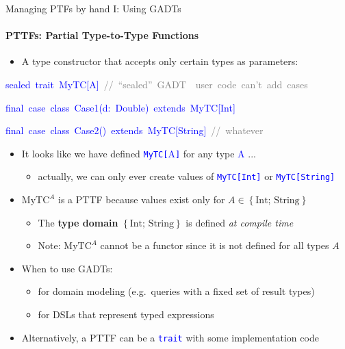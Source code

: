 \documentclass[english]{beamer}
\newenvironment{lyxcode}
   {\par\begin{list}{}{
     \setlength{\rightmargin}{\leftmargin}
     \setlength{\listparindent}{0pt}%
     \raggedright
     \setlength{\itemsep}{0pt}
     \setlength{\parsep}{0pt}
     \normalfont\ttfamily}%
    \def\{{\char`\{}
    \def\}{\char`\}}
    \def\textasciitilde{\char`\~}
    \item[]}
   {\end{list}}
\begin{document}
\begin{frame}{Managing PTFs by hand I: Using GADTs}


\framesubtitle{PTTFs: Partial Type-to-Type Functions}
\begin{itemize}
\item A type constructor that accepts only certain types as parameters:
\end{itemize}
\begin{lyxcode}
\textcolor{blue}{\footnotesize{}sealed~trait~MyTC{[}A{]}~}\textrm{\textcolor{gray}{\footnotesize{}//~``sealed''~GADT~\textendash{}~user~code~can't~add~cases}}{\footnotesize \par}

\textcolor{blue}{\footnotesize{}final~case~class~Case1(d:~Double)~extends~MyTC{[}Int{]}}{\footnotesize \par}

\textcolor{blue}{\footnotesize{}final~case~class~Case2()~extends~MyTC{[}String{]}}\textrm{\textcolor{gray}{\footnotesize{}~//~whatever}}{\footnotesize \par}
\end{lyxcode}
\begin{itemize}
\item It looks like we have defined \texttt{\textcolor{blue}{\footnotesize{}MyTC{[}}}\textcolor{blue}{\footnotesize{}A}\texttt{\textcolor{blue}{\footnotesize{}{]}}}
for any type \textcolor{blue}{\footnotesize{}A} ...
\begin{itemize}
\item actually, we can only ever create values of \texttt{\textcolor{blue}{\footnotesize{}MyTC{[}Int{]}}}
or \texttt{\textcolor{blue}{\footnotesize{}MyTC{[}String{]}}}{\footnotesize \par}
\end{itemize}
\item $\text{MyTC}^{A}$ is a PTTF because values exist only for $A\in\left\{ \text{Int};\,\text{String}\right\} $
\begin{itemize}
\item The \textbf{type domain} $\left\{ \text{Int};\,\text{String}\right\} $
is defined \emph{at compile time}
\item Note: $\text{MyTC}^{A}$ cannot be a functor since it is not defined
for all types $A$
\end{itemize}
\item When to use GADTs:
\begin{itemize}
\item for domain modeling (e.g.\ queries with a fixed set of result types)
\item for DSLs that represent typed expressions
\end{itemize}
\item Alternatively, a PTTF can be a \texttt{\textcolor{blue}{\footnotesize{}trait}}
with some implementation code
\end{itemize}
\end{frame}
\end{document}
